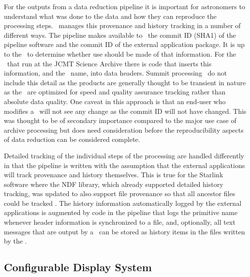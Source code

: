 \documentclass[final,authoryear,5p,times,twocolumn]{elsarticle}
\begin{document}
For the outputs from a data reduction pipeline it is important for
astronomers to understand what was done to the data and how they can
reproduce the processing steps. \oracdr\ manages this provenance and
history tracking in a number of different ways. The pipeline makes available to
\primitives\ the commit ID (SHA1) of the pipeline software and the
commit ID of the external application package. It is up to the
\recipe\ to determine whether use should be made of that
information. For the \recipes\ that run at the JCMT Science Archive
\citep{2014Economou} there is code that inserts this information, and
the \recipe\ name, into data headers. Summit processing \recipes\ do
not include this detail as the products are generally thought to be
transient in nature as the \recipes\ are optimized for speed and
quality assurance tracking rather than absolute data quality. One
caveat in this approach is that an end-user who modifies a
\recipe\ will not see any change as the commit ID will not have
changed. This was thought to be of secondary importance compared to
the major use case of archive processing but does need consideration
before the reproducibility aspects of data reduction can be considered
complete.

Detailed tracking of the individual steps of the processing are
handled differently in that the pipeline is written with the
assumption that the external applications will track provenance and
history themselves. This is true for the Starlink software where the
NDF library, which already supported detailed history tracking, was
updated to also support file provenance so that all ancestor files
could be tracked \citep[see e.g.][for details on the provenance algorithm]{ndfjenness}.
The history information automatically logged by the external
applications is augmented by code in the pipeline that logs the
primitive name whenever header information is synchronized to a file,
and, optionally, all text messages that are output by a \primitive\ can be
stored as history items in the files written by the \primitive.

\subsection{Configurable Display System}
\end{document}
